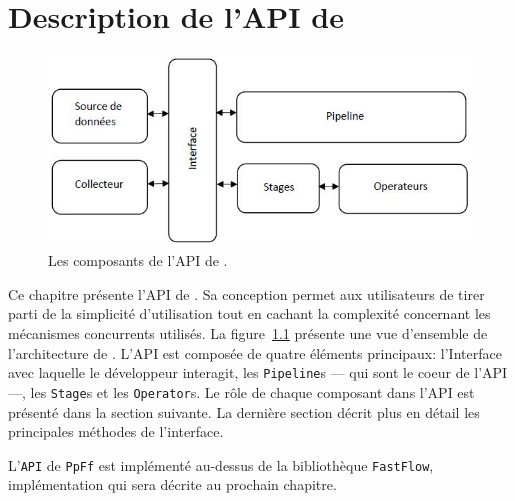 
\chapter{Description de l'API de \PpFf}
\label{description.chap}


\begin{figure}[ht]
\centering
     \includegraphics[width=1.0\textwidth]{Figures/ComponentsAPI.jpg}
      \caption{Les composants de l'API de \ppff.}
       \label{ComponentsAPI.fig}
\end{figure}




Ce chapitre pr\'esente l'API de \ppff. Sa conception permet aux utilisateurs de tirer parti de la simplicit\'e d'utilisation tout en cachant la complexit\'e concernant les m\'ecanismes concurrents utilis\'es. La figure~\ref{ComponentsAPI.fig} pr\'esente une vue d'ensemble de l'architecture de \ppff. L'API est compos\'ee de quatre \'el\'ements principaux: l'Interface avec laquelle le d\'eveloppeur interagit, les \texttt{Pipeline}s --- qui sont le coeur de l'API ---, les \texttt{Stage}s et les \texttt{Operator}s. Le r\^ole de chaque composant dans l'API est pr\'esent\'e dans la section suivante. La derni\`ere section  d\'ecrit plus en d\'etail les principales m\'ethodes de l'interface.



L'\texttt{API} de \texttt{PpFf} est impl\'ement\'e au-dessus de la biblioth\`eque \texttt{FastFlow}, impl\'ementation qui sera d\'ecrite au prochain chapitre.

